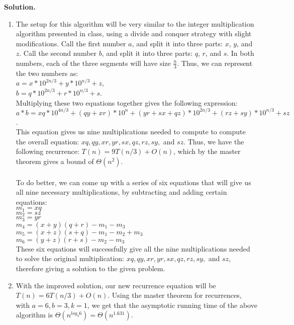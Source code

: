 \documentclass[11pt]{article}
\newcommand\solution{%
  \textbf{Solution.}\\%
}
\begin{document}
\begin{enumerate}
\solution
\begin{enumerate}[label=(\alph*)]
\item
The setup for this algorithm will be very similar to the integer multiplication algorithm presented in class, using a divide and conquer strategy with slight modifications. Call the first number $a$, and split it into three parts: $x$, $y$, and $z$. Call the second number $b$, and split it into three parts: $q$, $r$, and $s$. In both numbers, each of the three segments will have size $\frac{n}{3}$. Thus, we can represent the two numbers as: \\
$a = x*10^{2n/3} + y * 10^{n/3} + z$, \\
$b = q * 10^{2n/3} + r * 10^{n/3} + s$. \\
Multiplying these two equations together gives the following expression: \\
$a*b = xq*10^{4n/3} + (qy + xr)*10^n + (yr + sx + qz)*10^{2n/3} + (rz+sy)*10^{n/3} + sz$. \\
This equation gives us nine multiplications needed to compute to compute the overall equation: $xq, qy, xr, yr, sx, qz, rz, sy,$ and $sz$. Thus, we have the following recurrence: $T(n) = 9T(n/3) + O(n)$, which by the master theorem gives a bound of $\Theta(n^2)$.\\
\\
To do better, we can come up with a series of six equations that will give us all nine necessary multiplications, by subtracting and adding certain equations: \\
$m_1 = xq$ \\
$m_2 = sz$ \\
$m_3 = yr$ \\
$m_4 = (x+y)(q+r) - m_1 - m_3$ \\
$m_5 = (x+z)(s+q) - m_1 - m_2 + m_3$ \\
$m_6 = (y+z)(r+s) - m_2 - m_3$ \\
These six equations will successfully give all the nine multiplications needed to solve the original multiplication: $xq, qy, xr, yr, sx, qz, rz, sy,$ and $sz$, therefore giving a solution to the given problem.

\item
With the improved solution, our new recurrence equation will be $T(n) = 6T(n/3) + O(n)$. Using the master theorem for recurrences, with $a = 6, b = 3, k = 1$, we get that the asymptotic running time of the above algorithm is $\Theta(n^{log_3 6}) = \Theta(n^{1.631})$. \\


\end{enumerate}
\end{enumerate}
\end{document}
